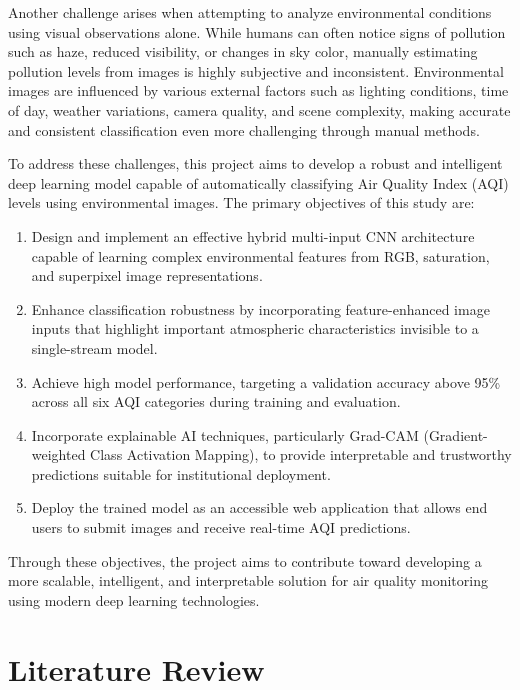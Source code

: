 \documentclass[conference]{IEEEtran}
\begin{document}
Another challenge arises when attempting to analyze environmental conditions
using visual observations alone. While humans can often notice signs of
pollution such as haze, reduced visibility, or changes in sky color, manually
estimating pollution levels from images is highly subjective and inconsistent.
Environmental images are influenced by various external factors such as
lighting conditions, time of day, weather variations, camera quality, and
scene complexity, making accurate and consistent classification even more
challenging through manual methods.

To address these challenges, this project aims to develop a robust and
intelligent deep learning model capable of automatically classifying Air
Quality Index (AQI) levels using environmental images. The primary objectives
of this study are:

\begin{enumerate}
  \item Design and implement an effective hybrid multi-input CNN architecture
        capable of learning complex environmental features from RGB, saturation,
        and superpixel image representations.
  \item Enhance classification robustness by incorporating feature-enhanced
        image inputs that highlight important atmospheric characteristics
        invisible to a single-stream model.
  \item Achieve high model performance, targeting a validation accuracy above
        95\% across all six AQI categories during training and evaluation.
  \item Incorporate explainable AI techniques, particularly Grad-CAM
        (Gradient-weighted Class Activation Mapping), to provide interpretable
        and trustworthy predictions suitable for institutional deployment.
  \item Deploy the trained model as an accessible web application that allows
        end users to submit images and receive real-time AQI predictions.
\end{enumerate}

Through these objectives, the project aims to contribute toward developing a
more scalable, intelligent, and interpretable solution for air quality
monitoring using modern deep learning technologies.

\section{Literature Review}
\end{document}

